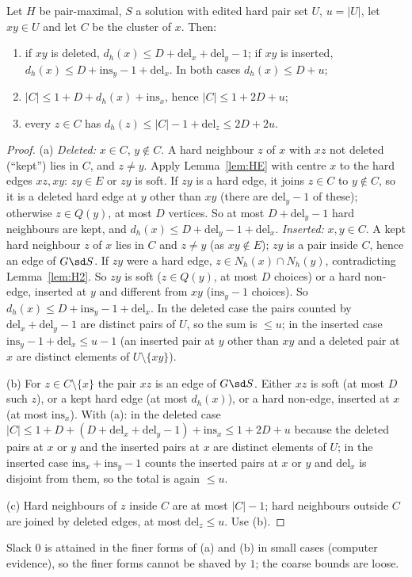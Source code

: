 \begin{lemma}\label{lem:EX}
Let $H$ be pair-maximal, $S$ a solution with edited hard pair set $U$, $u=|U|$, let $xy\in U$ and let $C$ be the cluster of $x$. Then:
\begin{enumerate}
\item[(a)] if $xy$ is deleted, $d_h(x)\le D+\mathrm{del}_x+\mathrm{del}_y-1$; if $xy$ is inserted, $d_h(x)\le D+\mathrm{ins}_y-1+\mathrm{del}_x$. In both cases $d_h(x)\le D+u$;
\item[(b)] $|C|\le1+D+d_h(x)+\mathrm{ins}_x$, hence $|C|\le1+2D+u$;
\item[(c)] every $z\in C$ has $d_h(z)\le|C|-1+\mathrm{del}_z\le2D+2u$.
\end{enumerate}
\end{lemma}
\begin{proof}
(a) \emph{Deleted:} $x\in C$, $y\notin C$. A hard neighbour $z$ of $x$ with $xz$ not deleted (``kept'') lies in $C$, and $z\ne y$. Apply Lemma~\ref{lem:HE} with centre $x$ to the hard edges $xz,xy$: $zy\in E$ or $zy$ is soft. If $zy$ is a hard edge, it joins $z\in C$ to $y\notin C$, so it is a deleted hard edge at $y$ other than $xy$ (there are $\mathrm{del}_y-1$ of these); otherwise $z\in Q(y)$, at most $D$ vertices. So at most $D+\mathrm{del}_y-1$ hard neighbours are kept, and $d_h(x)\le D+\mathrm{del}_y-1+\mathrm{del}_x$. \emph{Inserted:} $x,y\in C$. A kept hard neighbour $z$ of $x$ lies in $C$ and $z\ne y$ (as $xy\notin E$); $zy$ is a pair inside $C$, hence an edge of $G\sd S$. If $zy$ were a hard edge, $z\in N_h(x)\cap N_h(y)$, contradicting Lemma~\ref{lem:H2}. So $zy$ is soft ($z\in Q(y)$, at most $D$ choices) or a hard non-edge, inserted at $y$ and different from $xy$ ($\mathrm{ins}_y-1$ choices). So $d_h(x)\le D+\mathrm{ins}_y-1+\mathrm{del}_x$. In the deleted case the pairs counted by $\mathrm{del}_x+\mathrm{del}_y-1$ are distinct pairs of $U$, so the sum is $\le u$; in the inserted case $\mathrm{ins}_y-1+\mathrm{del}_x\le u-1$ (an inserted pair at $y$ other than $xy$ and a deleted pair at $x$ are distinct elements of $U\setminus\{xy\}$).

(b) For $z\in C\setminus\{x\}$ the pair $xz$ is an edge of $G\sd S$. Either $xz$ is soft (at most $D$ such $z$), or a kept hard edge (at most $d_h(x)$), or a hard non-edge, inserted at $x$ (at most $\mathrm{ins}_x$). With (a): in the deleted case $|C|\le1+D+(D+\mathrm{del}_x+\mathrm{del}_y-1)+\mathrm{ins}_x\le1+2D+u$ because the deleted pairs at $x$ or $y$ and the inserted pairs at $x$ are distinct elements of $U$; in the inserted case $\mathrm{ins}_x+\mathrm{ins}_y-1$ counts the inserted pairs at $x$ or $y$ and $\mathrm{del}_x$ is disjoint from them, so the total is again $\le u$.

(c) Hard neighbours of $z$ inside $C$ are at most $|C|-1$; hard neighbours outside $C$ are joined by deleted edges, at most $\mathrm{del}_z\le u$. Use (b).
\end{proof}
Slack $0$ is attained in the finer forms of (a) and (b) in small cases (computer evidence), so the finer forms cannot be shaved by $1$; the coarse bounds are loose.

